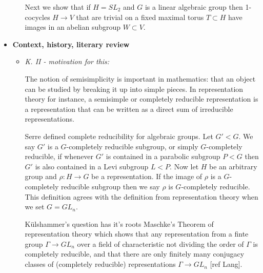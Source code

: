 \begin{itemize}
\begin{itemize}
		Next we show that if $H = SL_2$ and $G$ is a linear algebraic group then 1-cocycles $H\rightarrow V$ that are trivial on a fixed maximal torus $T\subset H$ have images in an abelian subgroup $W\subset V$.
	\end{itemize}

	\item[] \textbf{Context, history, literary review}
	\begin{itemize}
		\item \emph{K. II - motivation for this:}
		
		
		The notion of semisimplicity is important in mathematics: that an object can be studied by breaking it up into simple pieces. In representation theory for instance, a semisimple or completely reducible representation is a representation that can be written as a direct sum of irreducible representations.
		
		
		Serre defined complete reducibility for algebraic groups. Let $G' < G$. We say $G'$ is a $G$-completely reducible subgroup, or simply $G$-completely reducible, if whenever $G'$ is contained in a parabolic subgroup $P < G$ then $G'$ is also contained in a Levi subgroup $L < P$. Now let $H$ be an arbitrary group and $\rho:H\rightarrow G$ be a representation. If the image of $\rho$ is a $G$-completely reducible subgroup then we say $\rho$ is $G$-completely reducible. This definition agrees with the definition from representation theory when we set $G=GL_n$.
		
		
		K\"ulshammer's question has it's roots Maschke's Theorem of representation theory which shows that any representation from a finte group $\Gamma \rightarrow GL_n$ over a field of characteristic not dividing the order of $\Gamma$ is completely reducible, and that there are only finitely many conjugacy classes of (completely reducible) representations $\Gamma \rightarrow GL_n$ [ref Lang].
		

\end{itemize}
\end{itemize}
